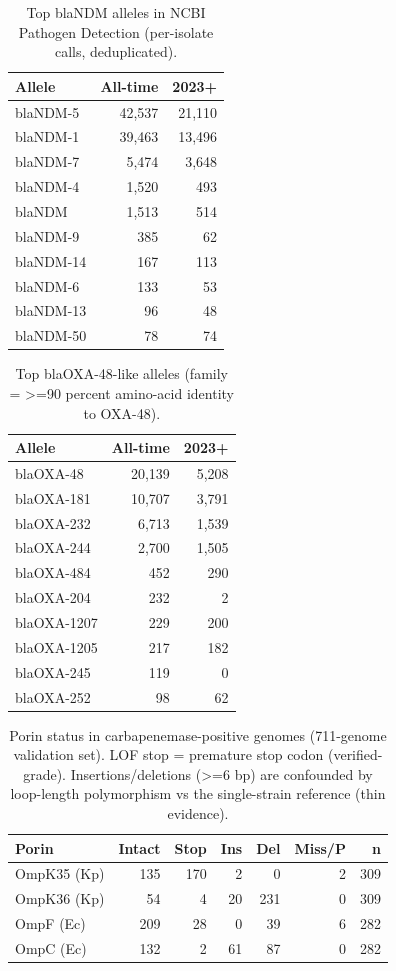 \begin{table}[h]\centering\small\caption{Top blaNDM alleles in NCBI Pathogen Detection (per-isolate calls, deduplicated).}\label{tab:ndm}\begin{tabular}{lrr}\hline
\textbf{Allele}&\textbf{All-time}&\textbf{2023+}\\\hline
blaNDM-5&42,537&21,110\\
blaNDM-1&39,463&13,496\\
blaNDM-7&5,474&3,648\\
blaNDM-4&1,520&493\\
blaNDM&1,513&514\\
blaNDM-9&385&62\\
blaNDM-14&167&113\\
blaNDM-6&133&53\\
blaNDM-13&96&48\\
blaNDM-50&78&74\\
\hline\end{tabular}\end{table}
\begin{table}[h]\centering\small\caption{Top blaOXA-48-like alleles (family = >=90 percent amino-acid identity to OXA-48).}\label{tab:oxa}\begin{tabular}{lrr}\hline
\textbf{Allele}&\textbf{All-time}&\textbf{2023+}\\\hline
blaOXA-48&20,139&5,208\\
blaOXA-181&10,707&3,791\\
blaOXA-232&6,713&1,539\\
blaOXA-244&2,700&1,505\\
blaOXA-484&452&290\\
blaOXA-204&232&2\\
blaOXA-1207&229&200\\
blaOXA-1205&217&182\\
blaOXA-245&119&0\\
blaOXA-252&98&62\\
\hline\end{tabular}\end{table}
\begin{table}[h]\centering\small\caption{Porin status in carbapenemase-positive genomes (711-genome validation set). LOF stop = premature stop codon (verified-grade). Insertions/deletions (>=6 bp) are confounded by loop-length polymorphism vs the single-strain reference (thin evidence).}\label{tab:porin}\begin{tabular}{lrrrrrr}\hline
\textbf{Porin}&\textbf{Intact}&\textbf{Stop}&\textbf{Ins}&\textbf{Del}&\textbf{Miss/P}&\textbf{n}\\\hline
OmpK35 (Kp)&135&170&2&0&2&309\\
OmpK36 (Kp)&54&4&20&231&0&309\\
OmpF (Ec)&209&28&0&39&6&282\\
OmpC (Ec)&132&2&61&87&0&282\\
\hline\end{tabular}\end{table}
